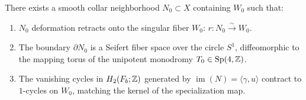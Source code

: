 \begin{theorem}\label{thm:toric-retraction}
There exists a smooth collar neighborhood $N_0 \subset X$ containing $W_0$ such that:
\begin{enumerate}[label=(\alph*)]
    \item $N_0$ deformation retracts onto the singular fiber $W_0$: $r \colon N_0 \xrightarrow{\sim} W_0$.
    \item The boundary $\partial N_0$ is a Seifert fiber space over the circle $S^1$, diffeomorphic to the mapping torus of the unipotent monodromy $T_0 \in \mathrm{Sp}(4, \mathbb{Z})$.
    \item The vanishing cycles in $H_2(F_b; \mathbb{Z})$ generated by $\operatorname{im}(N) = \langle \gamma, u \rangle$ contract to $1$-cycles on $W_0$, matching the kernel of the specialization map.
\end{enumerate}
\end{theorem}
